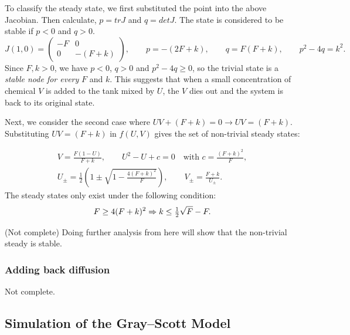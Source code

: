 \documentclass[a4paper, 11pt]{article}
\begin{document}
To classify the steady state, we first substituted the point into the above Jacobian. Then calculate, $p = tr J$ and $q = det J$. The state is considered to be stable if $p < 0$ and $q > 0$.
\begin{equation}
	\label{eq:gs-jacobian-trivial}
	J(1, 0) =
	\begin{pmatrix}
		-F & 0        \\
		0  & -(F + k)
	\end{pmatrix},
	\qquad p = -(2F + k), \qquad q = F(F + k), \qquad p^2 - 4q = k^2 .
\end{equation}
Since $F, k > 0$, we have $p < 0$, $q > 0$ and $p^2 - 4q \geq 0$, so the trivial state is a \emph{stable node for every} $F$ and $k$. This suggests that when a small concentration of chemical $V$  is added to the tank mixed by $U$, the $V$ dies out and the system is back to its original state.

Next, we consider the second case where $UV + (F + k) = 0 \rightarrow UV = (F + k)$. Substituting $UV = (F + k)$ in $f(U,V)$ gives the set of non-trivial steady states:

\begin{equation}
	\label{eq:gs-nontrivial}
	\begin{gathered}
		V = \frac{F(1 - U)}{F + k}, \qquad
		U^2 - U + c = 0 \quad \text{with } c = \frac{(F + k)^2}{F}, \\[4pt]
		U_\pm = \frac{1}{2}\left(1 \pm \sqrt{1 - \frac{4(F + k)^2}{F}}\right), \qquad
		V_\pm = \frac{F + k}{U_\pm}.
	\end{gathered}
\end{equation}
The steady states only exist under the following condition:
\begin{equation}
	\label{eq:saddle-node}
	F \ge 4(F + k)^2 \Rightarrow k \leq \tfrac{1}{2}\sqrt{F} - F .
\end{equation}

(Not complete) Doing further analysis from here will show that the non-trivial steady is stable.  

\subsubsection*{Adding back diffusion}
Not complete. 


\subsection{Simulation of the Gray--Scott Model} 
\label{sec:numerical}
\end{document}
